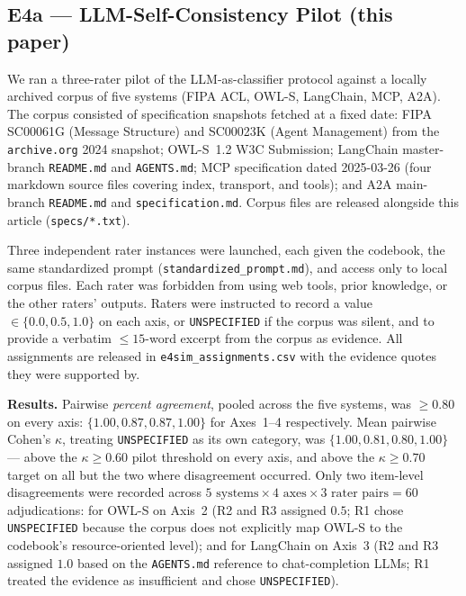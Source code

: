 \documentclass{IEEEcsmag}
\begin{document}
\subsection{E4a --- LLM-Self-Consistency Pilot (this paper)}\label{sec:e4a}

We ran a three-rater pilot of the LLM-as-classifier protocol against a locally archived corpus of five systems (FIPA ACL, OWL-S, LangChain, MCP, A2A).  The corpus consisted of specification snapshots fetched at a fixed date: FIPA SC00061G (Message Structure) and SC00023K (Agent Management) from the \texttt{archive.org} 2024 snapshot; OWL-S~1.2 W3C Submission; LangChain master-branch \texttt{README.md} and \texttt{AGENTS.md}; MCP specification dated 2025-03-26 (four markdown source files covering index, transport, and tools); and A2A main-branch \texttt{README.md} and \texttt{specification.md}.  Corpus files are released alongside this article (\texttt{specs/*.txt}).

Three independent rater instances were launched, each given the codebook, the same standardized prompt (\texttt{standardized\_prompt.md}), and access only to local corpus files.  Each rater was forbidden from using web tools, prior knowledge, or the other raters' outputs.  Raters were instructed to record a value $\in \{0.0, 0.5, 1.0\}$ on each axis, or \texttt{UNSPECIFIED} if the corpus was silent, and to provide a verbatim $\leq 15$-word excerpt from the corpus as evidence.  All assignments are released in \texttt{e4sim\_assignments.csv} with the evidence quotes they were supported by.

\textbf{Results.}  Pairwise \emph{percent agreement}, pooled across the five systems, was $\geq 0.80$ on every axis: $\{1.00, 0.87, 0.87, 1.00\}$ for Axes~1--4 respectively.  Mean pairwise Cohen's $\kappa$, treating \texttt{UNSPECIFIED} as its own category, was $\{1.00, 0.81, 0.80, 1.00\}$ --- above the $\kappa \geq 0.60$ pilot threshold on every axis, and above the $\kappa \geq 0.70$ target on all but the two where disagreement occurred.  Only two item-level disagreements were recorded across $5\text{ systems}\times 4\text{ axes}\times 3\text{ rater pairs} = 60$ adjudications: for OWL-S on Axis~2 (R2 and R3 assigned $0.5$; R1 chose \texttt{UNSPECIFIED} because the corpus does not explicitly map OWL-S to the codebook's resource-oriented level); and for LangChain on Axis~3 (R2 and R3 assigned $1.0$ based on the \texttt{AGENTS.md} reference to chat-completion LLMs; R1 treated the evidence as insufficient and chose \texttt{UNSPECIFIED}).
\end{document}
